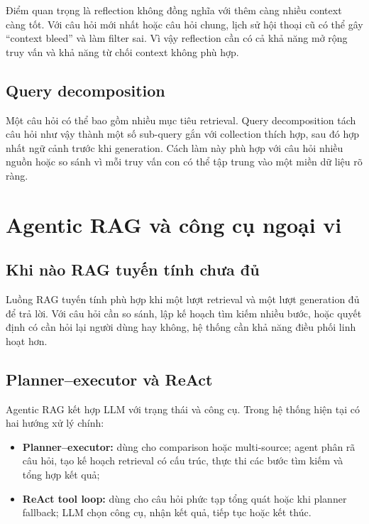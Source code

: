 \documentclass[../DoAn.tex]{subfiles}
\begin{document}
Điểm quan trọng là reflection không đồng nghĩa với thêm càng nhiều context càng
tốt. Với câu hỏi mới nhất hoặc câu hỏi chung, lịch sử hội thoại cũ có thể gây
``context bleed'' và làm filter sai. Vì vậy reflection cần có cả khả năng mở rộng
truy vấn và khả năng từ chối context không phù hợp.

\subsection{Query decomposition}

Một câu hỏi có thể bao gồm nhiều mục tiêu retrieval. Query decomposition tách câu
hỏi như vậy thành một số sub-query gắn với collection thích hợp, sau đó hợp nhất
ngữ cảnh trước khi generation. Cách làm này phù hợp với câu hỏi nhiều nguồn hoặc
so sánh vì mỗi truy vấn con có thể tập trung vào một miền dữ liệu rõ ràng.

\section{Agentic RAG và công cụ ngoại vi}

\subsection{Khi nào RAG tuyến tính chưa đủ}

Luồng RAG tuyến tính phù hợp khi một lượt retrieval và một lượt generation đủ để
trả lời. Với câu hỏi cần so sánh, lập kế hoạch tìm kiếm nhiều bước, hoặc quyết
định có cần hỏi lại người dùng hay không, hệ thống cần khả năng điều phối linh
hoạt hơn.

\subsection{Planner--executor và ReAct}

Agentic RAG kết hợp LLM với trạng thái và công cụ. Trong hệ thống hiện tại có hai
hướng xử lý chính:

\begin{itemize}
    \item \textbf{Planner--executor:} dùng cho comparison hoặc multi-source; agent
    phân rã câu hỏi, tạo kế hoạch retrieval có cấu trúc, thực thi các bước tìm
    kiếm và tổng hợp kết quả;
    \item \textbf{ReAct tool loop:} dùng cho câu hỏi phức tạp tổng quát hoặc khi
    planner fallback; LLM chọn công cụ, nhận kết quả, tiếp tục hoặc kết thúc.
\end{itemize}
\end{document}
